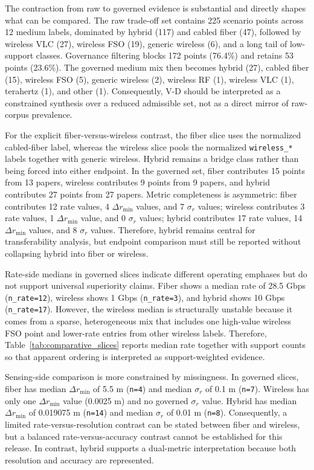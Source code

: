 \documentclass[lettersize,journal]{IEEEtran}
\begin{document}
The contraction from raw to governed evidence is substantial and directly shapes what can be compared. The raw trade-off set contains 225 scenario points across 12 medium labels, dominated by hybrid (117) and cabled fiber (47), followed by wireless VLC (27), wireless FSO (19), generic wireless (6), and a long tail of low-support classes. Governance filtering blocks 172 points (76.4\%) and retains 53 points (23.6\%). The governed medium mix then becomes hybrid (27), cabled fiber (15), wireless FSO (5), generic wireless (2), wireless RF (1), wireless VLC (1), terahertz (1), and other (1). Consequently, V-D should be interpreted as a constrained synthesis over a reduced admissible set, not as a direct mirror of raw-corpus prevalence.

For the explicit fiber-versus-wireless contrast, the fiber slice uses the normalized cabled-fiber label, whereas the wireless slice pools the normalized \texttt{wireless\_*} labels together with generic wireless. Hybrid remains a bridge class rather than being forced into either endpoint. In the governed set, fiber contributes 15 points from 13 papers, wireless contributes 9 points from 9 papers, and hybrid contributes 27 points from 27 papers. Metric completeness is asymmetric: fiber contributes 12 rate values, 4 $\Delta r_{\min}$ values, and 7 $\sigma_r$ values; wireless contributes 3 rate values, 1 $\Delta r_{\min}$ value, and 0 $\sigma_r$ values; hybrid contributes 17 rate values, 14 $\Delta r_{\min}$ values, and 8 $\sigma_r$ values. Therefore, hybrid remains central for transferability analysis, but endpoint comparison must still be reported without collapsing hybrid into fiber or wireless.

Rate-side medians in governed slices indicate different operating emphases but do not support universal superiority claims. Fiber shows a median rate of 28.5 Gbps (\texttt{n\_rate=12}), wireless shows 1 Gbps (\texttt{n\_rate=3}), and hybrid shows 10 Gbps (\texttt{n\_rate=17}). However, the wireless median is structurally unstable because it comes from a sparse, heterogeneous mix that includes one high-value wireless FSO point and lower-rate entries from other wireless labels. Therefore, Table~\ref{tab:comparative_slices} reports median rate together with support counts so that apparent ordering is interpreted as support-weighted evidence.

Sensing-side comparison is more constrained by missingness. In governed slices, fiber has median $\Delta r_{\min}$ of 5.5 m (\texttt{n=4}) and median $\sigma_r$ of 0.1 m (\texttt{n=7}). Wireless has only one $\Delta r_{\min}$ value (0.0025 m) and no governed $\sigma_r$ value. Hybrid has median $\Delta r_{\min}$ of 0.019075 m (\texttt{n=14}) and median $\sigma_r$ of 0.01 m (\texttt{n=8}). Consequently, a limited rate-versus-resolution contrast can be stated between fiber and wireless, but a balanced rate-versus-accuracy contrast cannot be established for this release. In contrast, hybrid supports a dual-metric interpretation because both resolution and accuracy are represented.
\end{document}
